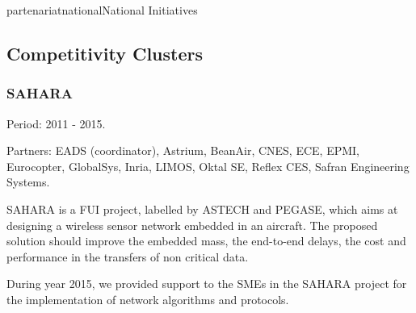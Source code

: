 \documentclass{ra2016}
\begin{document}


\begin{module}{partenariat}{national}{National Initiatives}


\subsection{Competitivity Clusters}

\subsubsection{SAHARA}

\begin{participants}
\end{participants}

Period: 2011 - 2015.

Partners: EADS (coordinator), Astrium, BeanAir, CNES, ECE, EPMI, Eurocopter, GlobalSys, Inria, LIMOS, Oktal SE, Reflex CES, Safran Engineering Systems.

SAHARA is a FUI project, labelled by ASTECH and PEGASE, which aims at designing a wireless sensor network embedded in an aircraft. The proposed solution should improve the embedded mass, the end-to-end delays, the cost and performance in the transfers of non critical data. 

During year 2015, we provided support to the SMEs in the SAHARA project for the implementation of network algorithms and protocols. 


\end{module}
\end{document}
